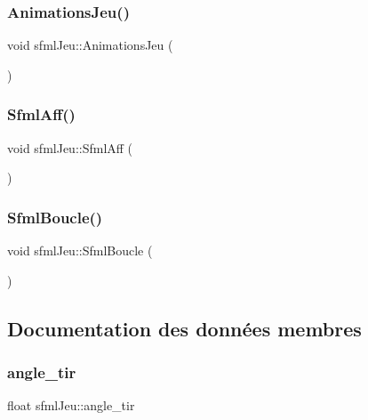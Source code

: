 \subsubsection{\texorpdfstring{Animations\+Jeu()}{AnimationsJeu()}}
{\footnotesize\ttfamily void sfml\+Jeu\+::\+Animations\+Jeu (\begin{DoxyParamCaption}{ }\end{DoxyParamCaption})}

\mbox{\label{classsfml_jeu_a3082e40c284f965963cb46ed6c1aa2d8}} 
\subsubsection{\texorpdfstring{Sfml\+Aff()}{SfmlAff()}}
{\footnotesize\ttfamily void sfml\+Jeu\+::\+Sfml\+Aff (\begin{DoxyParamCaption}{ }\end{DoxyParamCaption})}

\mbox{\label{classsfml_jeu_aef827d63e16694a7c6c5dccdab4efd7d}} 
\subsubsection{\texorpdfstring{Sfml\+Boucle()}{SfmlBoucle()}}
{\footnotesize\ttfamily void sfml\+Jeu\+::\+Sfml\+Boucle (\begin{DoxyParamCaption}{ }\end{DoxyParamCaption})}



\subsection{Documentation des données membres}
\mbox{\label{classsfml_jeu_ab18424bf232e9f1b62e11f640949bea1}} 
\subsubsection{\texorpdfstring{angle\+\_\+tir}{angle\_tir}}
{\footnotesize\ttfamily float sfml\+Jeu\+::angle\+\_\+tir}

